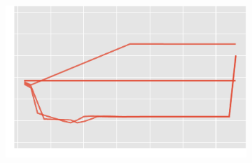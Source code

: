 \begin{figure}[htb]
{\begin{subfigure}[t]{0.5\textwidth+0.4in}
    \end{subfigure}%
    \begin{subfigure}[t]{0.5\textwidth+0.4in}%
		\includegraphics{img/harmonic_bf_lqw}%
    \end{subfigure}}\\%
\end{figure}
